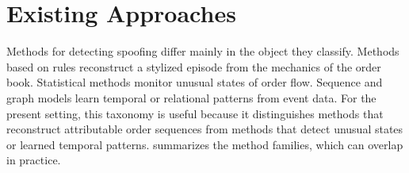 \documentclass[11pt]{article}
\newenvironment{review}{\begingroup\color{blue}}{\endgroup}
\begin{document}
\section{Existing Approaches}
\label{sec:existing_approaches}
\begin{review}Methods for detecting spoofing\end{review} differ mainly in the object they classify. \begin{review}Methods based on rules reconstruct a stylized episode from the mechanics of the order book\end{review}. Statistical methods monitor unusual states of order flow. Sequence and graph models learn
temporal or relational patterns from event data. For the present setting, this taxonomy is useful because it distinguishes
methods that reconstruct attributable order sequences from methods that detect unusual states or learned temporal patterns.
 summarizes the method families, which can overlap in practice.
\end{document}
